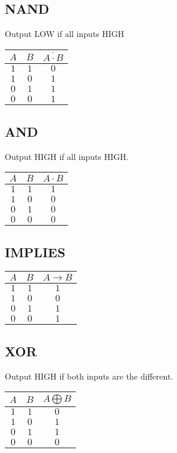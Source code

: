 \documentclass[12pt]{article}
\begin{document}
\subsection{NAND}
Output LOW if all inputs HIGH \bigskip\\
\begin{tabular}{|c|c|c|}\hline
$A$ & $B$ & $\overline{A\cdot B}$ \\\hline
$1$ & $1$ & $0$ \\\hline
$1$ & $0$ & $1$ \\\hline
$0$ & $1$ & $1$ \\\hline
$0$ & $0$ & $1$ \\\hline
\end{tabular}

\subsection{AND}
Output HIGH if all inputs HIGH. \bigskip\\
\begin{tabular}{|c|c|c|}\hline
$A$ & $B$ & $A\cdot B$ \\\hline
$1$ & $1$ & $1$ \\\hline
$1$ & $0$ & $0$ \\\hline
$0$ & $1$ & $0$ \\\hline
$0$ & $0$ & $0$ \\\hline
\end{tabular}

\subsection{IMPLIES}

\begin{tabular}{|c|c|c|}\hline
$A$ & $B$ & $A\rightarrow B$ \\\hline
$1$ & $1$ & $1$ \\\hline
$1$ & $0$ & $0$ \\\hline
$0$ & $1$ & $1$ \\\hline
$0$ & $0$ & $1$ \\\hline
\end{tabular}

\subsection{XOR}
Output HIGH if both inputs are the different. \bigskip\\
\begin{tabular}{|c|c|c|}\hline
$A$ & $B$ & $A \bigoplus B$ \\\hline
$1$ & $1$ & $0$ \\\hline
$1$ & $0$ & $1$ \\\hline
$0$ & $1$ & $1$ \\\hline
$0$ & $0$ & $0$ \\\hline
\end{tabular}
\end{document}
